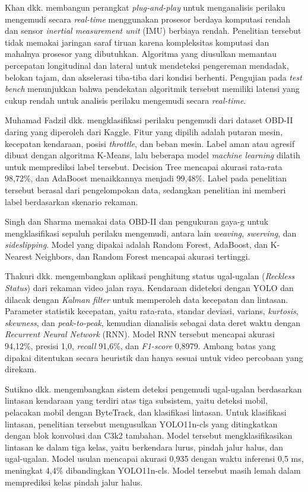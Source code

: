 Khan dkk. membangun perangkat \textit{plug-and-play} untuk menganalisis perilaku mengemudi secara \textit{real-time} menggunakan prosesor berdaya komputasi rendah dan sensor \textit{inertial measurement unit} (IMU) berbiaya rendah. Penelitian tersebut tidak memakai jaringan saraf tiruan karena kompleksitas komputasi dan mahalnya prosesor yang dibutuhkan. Algoritma yang diusulkan memantau percepatan longitudinal dan lateral untuk mendeteksi pengereman mendadak, belokan tajam, dan akselerasi tiba-tiba dari kondisi berhenti. Pengujian pada \textit{test bench} menunjukkan bahwa pendekatan algoritmik tersebut memiliki latensi yang cukup rendah untuk analisis perilaku mengemudi secara \textit{real-time}.

Muhamad Fadzil dkk. mengklasifikasi perilaku pengemudi dari dataset OBD-II daring yang diperoleh dari Kaggle. Fitur yang dipilih adalah putaran mesin, kecepatan kendaraan, posisi \textit{throttle}, dan beban mesin. Label aman atau agresif dibuat dengan algoritma K-Means, lalu beberapa model \textit{machine learning} dilatih untuk memprediksi label tersebut. Decision Tree mencapai akurasi rata-rata 98,72\%, dan AdaBoost menaikkannya menjadi 99,48\%. Label pada penelitian tersebut berasal dari pengelompokan data, sedangkan penelitian ini memberi label berdasarkan skenario rekaman.

Singh dan Sharma memakai data OBD-II dan pengukuran gaya-g untuk mengklasifikasi sepuluh perilaku mengemudi, antara lain \textit{weaving}, \textit{swerving}, dan \textit{sideslipping}. Model yang dipakai adalah Random Forest, AdaBoost, dan K-Nearest Neighbors, dan Random Forest mencapai akurasi tertinggi.

Thakuri dkk. mengembangkan aplikasi penghitung status ugal-ugalan (\textit{Reckless Status}) dari rekaman video jalan raya. Kendaraan dideteksi dengan YOLO dan dilacak dengan \textit{Kalman filter} untuk memperoleh data kecepatan dan lintasan. Parameter statistik kecepatan, yaitu rata-rata, standar deviasi, varians, \textit{kurtosis}, \textit{skewness}, dan \textit{peak-to-peak}, kemudian dianalisis sebagai data deret waktu dengan \textit{Recurrent Neural Network} (RNN). Model RNN tersebut mencapai akurasi 94,12\%, presisi 1,0, \textit{recall} 91,6\%, dan \textit{F1-score} 0,8979. Ambang batas yang dipakai ditentukan secara heuristik dan hanya sesuai untuk video percobaan yang direkam.

Sutikno dkk. mengembangkan sistem deteksi pengemudi ugal-ugalan berdasarkan lintasan kendaraan yang terdiri atas tiga subsistem, yaitu deteksi mobil, pelacakan mobil dengan ByteTrack, dan klasifikasi lintasan. Untuk klasifikasi lintasan, penelitian tersebut mengusulkan YOLO11n-cls yang ditingkatkan dengan blok konvolusi dan C3k2 tambahan. Model tersebut mengklasifikasikan lintasan ke dalam tiga kelas, yaitu berkendara lurus, pindah jalur halus, dan ugal-ugalan. Model usulan mencapai akurasi 0,935 dengan waktu inferensi 0,5 ms, meningkat 4,4\% dibandingkan YOLO11n-cls. Model tersebut masih lemah dalam memprediksi kelas pindah jalur halus.

